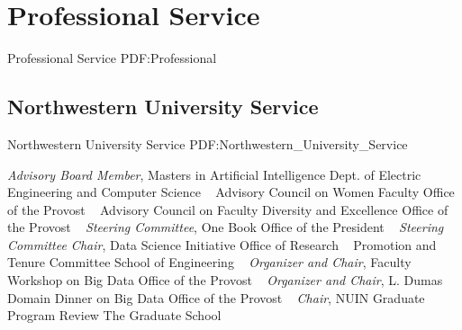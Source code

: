 \section
{Professional Service}
{Professional Service}
{PDF:Professional}

\subsection
{Northwestern University Service}
{Northwestern University Service}
{PDF:Northwestern_University_Service}

\GapNoBreak
{}
\textit{Advisory Board Member}, Masters in Artificial Intelligence\newline
Dept. of Electric Engineering and Computer Science \newline
~
\Gap
{}
Advisory Council on Women Faculty\newline
Office of the Provost \newline
~
\Gap
{}
Advisory Council on Faculty Diversity and Excellence\newline
Office of the Provost \newline
~
\Gap
{}
\textit{Steering Committee}, One Book\newline
Office of the President \newline
~
\Gap
{}
\textit{Steering Committee Chair}, Data Science Initiative \newline
Office of Research \newline
~
\Gap
{}
Promotion and Tenure Committee\newline
School of Engineering \newline
~
\Gap
{}
\textit{Organizer and Chair}, Faculty Workshop on Big Data\newline
Office of the Provost \newline
~
\Gap
{}
\textit{Organizer and Chair}, L. Dumas Domain Dinner on Big Data\newline
Office of the Provost \newline
~
\Gap
{}
\textit{Chair}, NUIN Graduate Program Review \newline
The Graduate School \newline
